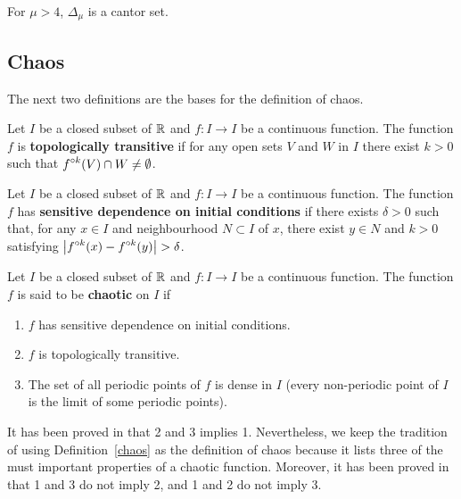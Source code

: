 \begin{theorem}
For $\mu > 4$, $\Delta_\mu$ is a cantor set.
\end{theorem}

\subsection{Chaos}

The next two definitions are the bases for the definition of chaos.

\begin{defn}
Let $I$ be a closed subset of $\mathbb{R}$ and $f:I\rightarrow I$ be a
continuous function.  The function $f$ is
{\bfseries topologically transitive} if
for any open sets $V$ and $W$ in $I$ there exist $k>0$ such that
$\displaystyle f^{\circ k}(V) \cap W \neq \emptyset$.
\end{defn}

\begin{defn}
Let $I$ be a closed subset of $\mathbb{R}$ and $f:I\rightarrow I$ be a
continuous function.  The function $f$ has
{\bfseries sensitive dependence on initial conditions} if there exists
$\delta>0$ such that, for any $x \in I$ and neighbourhood $N \subset I$
of $x$, there exist $y\in N$ and $k>0$ satisfying
$\displaystyle \left| f^{\circ k}(x) - f^{\circ k}(y) \right| > \delta$.
\end{defn}

\begin{defn}[Chaos]
Let $I$ be a closed subset of $\mathbb{R}$ and $f:I\rightarrow I$ be a
continuous function.  The function $f$ is said to be
{\bfseries chaotic} on $I$ if
\begin{enumerate}
\item $f$ has sensitive dependence on initial conditions.
\item $f$ is topologically transitive.
\item The set of all periodic points of $f$ is dense in $I$ (every
  non-periodic point of $I$ is the limit of some periodic points).
\end{enumerate}
\label{chaos}
\end{defn}

\begin{rmk}
It has been proved in \cite{BBCDS} that 2 and 3 implies 1.
Nevertheless, we keep the tradition of using Definition~\ref{chaos} as
the definition of chaos because it lists three of the must important
properties of a chaotic function.  Moreover, it has been proved in
\cite{AG} that 1 and 3 do not imply 2, and 1 and 2 do not imply 3.
\end{rmk}

